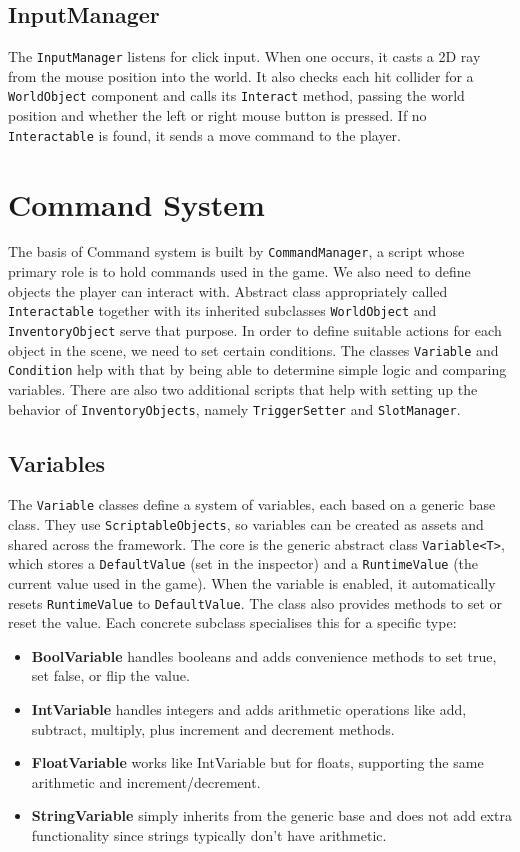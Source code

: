 \subsection{InputManager}
The \verb|InputManager| listens for click input. When one occurs, it casts a 2D ray from the mouse position into the world. It also checks each hit collider for a \verb|WorldObject| component and calls its \verb|Interact| method, passing the world position and whether the left or right mouse button is pressed. If no \verb|Interactable| is found, it sends a move command to the player.

\section{Command System}
\label{CommandSystem}
The basis of Command system is built by \verb|CommandManager|, a script whose primary role is to hold commands used in the game. We also need to define objects the player can interact with.  Abstract class appropriately called \verb|Interactable| together with its inherited subclasses \verb|WorldObject| and \verb|InventoryObject| serve that purpose. In order to define suitable actions for each object in the scene, we need to set certain conditions. The classes \verb|Variable| and \verb|Condition| help with that by being able to determine simple logic and comparing variables. There are also two additional scripts that help with setting up the behavior of \verb|InventoryObjects|, namely \verb|TriggerSetter| and \verb|SlotManager|.

\subsection{Variables}
The \verb|Variable| classes define a system of variables, each based on a generic base class. They use \verb|ScriptableObjects|, so variables can be created as assets and shared across the framework. The core is the generic abstract class \verb|Variable<T>|, which stores a \verb|DefaultValue| (set in the inspector) and a \verb|RuntimeValue| (the current value used in the game). When the variable is enabled, it automatically resets \verb|RuntimeValue| to \verb|DefaultValue|. The class also provides methods to set or reset the value. Each concrete subclass specialises this for a specific type:

\begin{itemize}
    \item \textbf{BoolVariable} handles booleans and adds convenience methods to set true, set false, or flip the value.
    \item \textbf{IntVariable} handles integers and adds arithmetic operations like add, subtract, multiply, plus increment and decrement methods.
    \item \textbf{FloatVariable} works like IntVariable but for floats, supporting the same arithmetic and increment/decrement.
    \item \textbf{StringVariable} simply inherits from the generic base and does not add extra functionality since strings typically don't have arithmetic.
\end{itemize}

